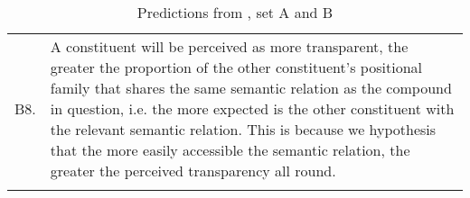 \begin{table}[p]
\begin{tabularx}{\textwidth}{lQ}
B8.&A constituent will be perceived as more transparent, the greater the proportion of the other constituent’s positional family that shares the same semantic relation as the compound in question, i.e. the more expected is the other constituent with the relevant semantic relation. This is because we hypothesis that the more easily accessible the semantic relation, the greater the perceived transparency all round.\\\lspbottomrule\end{tabularx}
\caption[Predictions]{Predictions from \citet{BellandSchaefer:2016}, set A and B}
\label{tab:predictions-AB}
\end{table}
